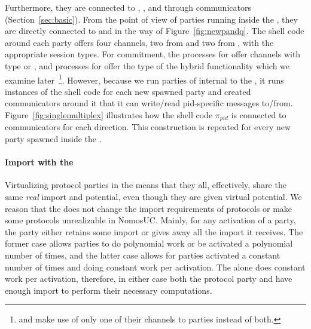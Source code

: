 Furthermore, they are connected to \Z, \A, and \F through communicators (Section~\ref{sec:basic}).
From the point of view of parties running inside the \partywrapper, they are directly connected to \F and \Z in the way of Figure~\ref{fig:newpandq}.
The shell code around each party offers four channels, two from \F and two from \Z, with the appropriate session types. 
For commitment, the processes for \Z offer channels with type  or , and processes for \F offer the type of the hybrid functionality \Fro which we examine later~\footnote{\Fcom and \Fro make use of only one of their channels to parties instead of both.}.
However, because we run parties of \PI internal to the \partywrapper, it runs instances of the shell code for each new spawned party and created communicators around it that it can write/read pid-specific messages to/from.
Figure~\ref{fig:singlemultiplex} illustrates how the shell code $\pi_{pid}$ is connected to communicators for each direction. This construction is repeated for every new party spawned inside the \partywrapper.

\paragraph{Import with the \partywrapper}
Virtualizing protocol parties in the \partywrapper means that they all, effectively, share the same \emph{real} import and potential, even though they are given virtual potential.
We reason that the \partywrapper does not change the import requirements of protocols or make some protocols unrealizable in NomosUC.
Mainly, for any activation of a party, the party either retains some import or gives away all the import it receives. 
The former case allows parties to do polynomial work or be activated a polynomial number of times, and the latter case allows for parties activated a constant number of times and doing constant work per activation.
The \partywrapper alone does constant work per activation, therefore, in either case both the protocol party and \partywrapper have enough import to perform their necessary computations.

